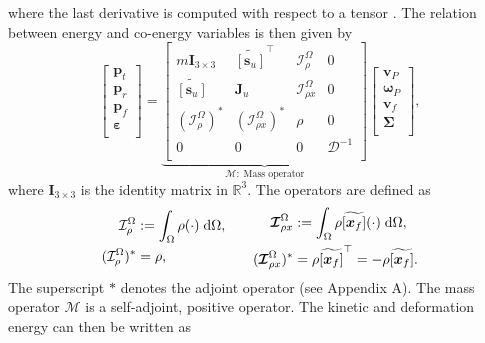 \documentclass{svjour3}                     %
\newcommand{\crmat}[1]{\ensuremath{\widetilde{\left[#1\right]}}}
\begin{document}
	where the last derivative is computed with respect to a tensor \cite{BRUGNOLI2019940}.
	The relation between energy and co-energy variables is then given by
	\begin{equation}
	\label{eq:mass_op}
	\begin{bmatrix}
	\bm{p}_t \\ \bm{p}_r \\ \bm{p}_f \\ \bm\varepsilon \\
	\end{bmatrix} = 
	\underbrace{\begin{bmatrix}
		m \bm{I}_{3\times 3} & \crmat{\bm{s}_u}^\top & \mathcal{I}_\rho^{\Omega} & 0 \\
		\crmat{\bm{s}_u} & \bm{J}_u & \bm{\mathcal{I}}_{\rho x}^{\Omega} & 0  \\
		(\mathcal{I}_\rho^{\Omega})^* & (\bm{\mathcal{I}}_{\rho x}^{\Omega})^* & \rho & 0  \\
		0 & 0 & 0 & \bm{\mathcal{D}}^{-1} \\
		\end{bmatrix}}_{\bm{\mathcal{M}}: \; \text{Mass operator}}
	\begin{bmatrix}
	\bm{v}_P \\ \bm{\omega}_P  \\ \bm{v}_f  \\ \bm\Sigma \\
	\end{bmatrix},
	\end{equation}
	where $\bm{I}_{3\times 3}$ is the identity matrix in $\mathbb{R}^3$. The operators are defined as
	\begin{equation*}
	\begin{aligned}
	\mathcal{I}_\rho^\Omega &:=\int_{\Omega} \rho (\cdot) \d{\Omega}, \\
	(\mathcal{I}_\rho^{\Omega})^* &= \rho, \\
	\end{aligned} \qquad
	\begin{aligned} 
	\bm{\mathcal{I}}_{\rho x}^{\Omega} &:= \int_\Omega \rho \crmat{\bm{x}_f} (\cdot) \d{\Omega}, \\
	(\bm{\mathcal{I}}_{\rho x}^{\Omega})^* &= \rho \crmat{\bm{x}_f}^\top= -\rho \crmat{\bm{x}_f}. \\
	\end{aligned}
	\end{equation*}
	The superscript $*$ denotes the adjoint operator (see Appendix A). The mass operator $\bm{\mathcal{M}}$ is a self-adjoint, positive operator. The kinetic and deformation energy can then be written as
\end{document}
